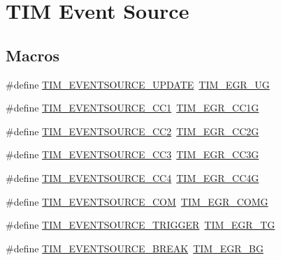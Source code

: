 \hypertarget{group___t_i_m___event___source}{}\section{T\+IM Event Source}
\label{group___t_i_m___event___source}
\subsection*{Macros}
\begin{DoxyCompactItemize}
\item 
\#define \hyperlink{group___t_i_m___event___source_ga6b9d1352735d2ddbafcaa31ae05cd1ee}{T\+I\+M\+\_\+\+E\+V\+E\+N\+T\+S\+O\+U\+R\+C\+E\+\_\+\+U\+P\+D\+A\+TE}~\hyperlink{group___peripheral___registers___bits___definition_ga16f52a8e9aad153223405b965566ae91}{T\+I\+M\+\_\+\+E\+G\+R\+\_\+\+UG}
\item 
\#define \hyperlink{group___t_i_m___event___source_ga529eadf26cd17108dd95b9707a3d0f55}{T\+I\+M\+\_\+\+E\+V\+E\+N\+T\+S\+O\+U\+R\+C\+E\+\_\+\+C\+C1}~\hyperlink{group___peripheral___registers___bits___definition_ga0a1318609761df5de5213e9e75b5aa6a}{T\+I\+M\+\_\+\+E\+G\+R\+\_\+\+C\+C1G}
\item 
\#define \hyperlink{group___t_i_m___event___source_ga12e3a98c601f4f288354ac2538050e6b}{T\+I\+M\+\_\+\+E\+V\+E\+N\+T\+S\+O\+U\+R\+C\+E\+\_\+\+C\+C2}~\hyperlink{group___peripheral___registers___bits___definition_ga5423de00e86aeb8a4657a509af485055}{T\+I\+M\+\_\+\+E\+G\+R\+\_\+\+C\+C2G}
\item 
\#define \hyperlink{group___t_i_m___event___source_ga1c2faf942ab525b44299ddd0a6d848e4}{T\+I\+M\+\_\+\+E\+V\+E\+N\+T\+S\+O\+U\+R\+C\+E\+\_\+\+C\+C3}~\hyperlink{group___peripheral___registers___bits___definition_ga064d2030abccc099ded418fd81d6aa07}{T\+I\+M\+\_\+\+E\+G\+R\+\_\+\+C\+C3G}
\item 
\#define \hyperlink{group___t_i_m___event___source_ga157e43c99e6a1c0097b184cc842b5dfb}{T\+I\+M\+\_\+\+E\+V\+E\+N\+T\+S\+O\+U\+R\+C\+E\+\_\+\+C\+C4}~\hyperlink{group___peripheral___registers___bits___definition_ga1c4e5555dd3be8ab1e631d1053f4a305}{T\+I\+M\+\_\+\+E\+G\+R\+\_\+\+C\+C4G}
\item 
\#define \hyperlink{group___t_i_m___event___source_ga5724ce4aaf842a2166edaaff1531c1d1}{T\+I\+M\+\_\+\+E\+V\+E\+N\+T\+S\+O\+U\+R\+C\+E\+\_\+\+C\+OM}~\hyperlink{group___peripheral___registers___bits___definition_gadb06f8bb364307695c7d6a028391de7b}{T\+I\+M\+\_\+\+E\+G\+R\+\_\+\+C\+O\+MG}
\item 
\#define \hyperlink{group___t_i_m___event___source_ga85573ed76442490db67e4b759fe6d901}{T\+I\+M\+\_\+\+E\+V\+E\+N\+T\+S\+O\+U\+R\+C\+E\+\_\+\+T\+R\+I\+G\+G\+ER}~\hyperlink{group___peripheral___registers___bits___definition_ga2eabface433d6adaa2dee3df49852585}{T\+I\+M\+\_\+\+E\+G\+R\+\_\+\+TG}
\item 
\#define \hyperlink{group___t_i_m___event___source_ga83d16368fe3172a98c41d7c414780a64}{T\+I\+M\+\_\+\+E\+V\+E\+N\+T\+S\+O\+U\+R\+C\+E\+\_\+\+B\+R\+E\+AK}~\hyperlink{group___peripheral___registers___bits___definition_ga08c5635a0ac0ce5618485319a4fa0f18}{T\+I\+M\+\_\+\+E\+G\+R\+\_\+\+BG}
\end{DoxyCompactItemize}


